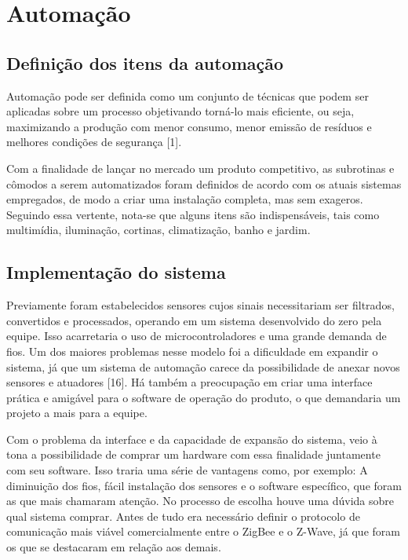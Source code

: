 \chapter{Automação}

\section{Definição dos itens da automação}

	Automação pode ser definida como um conjunto de técnicas que podem ser aplicadas sobre um processo objetivando torná-lo mais eficiente, ou seja, maximizando a produção com menor consumo, menor emissão de resíduos e melhores condições de segurança [1].

	Com a finalidade de lançar no mercado um produto competitivo, as subrotinas e cômodos a serem automatizados foram definidos de acordo com os atuais sistemas empregados, de modo a criar uma instalação completa, mas sem exageros. Seguindo essa vertente, nota-se que alguns itens são indispensáveis, tais como multimídia, iluminação, cortinas, climatização, banho e jardim.

\section{Implementação do sistema}

	Previamente foram estabelecidos sensores cujos sinais necessitariam ser filtrados, convertidos e processados, operando em um sistema desenvolvido do zero pela equipe. Isso acarretaria o uso de microcontroladores e uma grande demanda de fios. Um dos maiores problemas nesse modelo foi a dificuldade em expandir o sistema, já que um sistema de automação carece da possibilidade de anexar novos sensores e atuadores [16]. Há também a preocupação em criar uma interface prática e amigável para o software de operação do produto, o que demandaria um projeto a mais para a equipe. 

	Com o problema da interface e da capacidade de expansão do sistema, veio à tona a possibilidade de comprar um hardware com essa finalidade juntamente com seu software. Isso traria uma série de vantagens como, por exemplo: A diminuição dos fios, fácil instalação dos sensores e o software específico, que foram as que mais chamaram atenção. No processo de escolha houve uma dúvida sobre qual sistema comprar. Antes de tudo era necessário definir o protocolo de comunicação mais viável comercialmente entre o ZigBee e o Z-Wave, já que foram os que se destacaram em relação aos demais.


